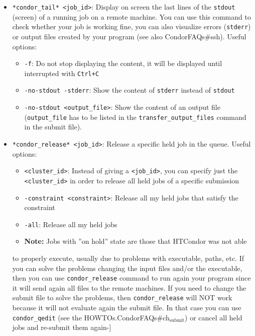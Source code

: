 \documentclass[a4paper,10pt]{article}
\begin{document}
\begin{itemize}
\item \texttt{*condor\_tail* <job\_id>}: Display on screen the last lines of the \texttt{stdout}
(screen) of a running job on a remote machine. You can use this command to
check whether your job is working fine, you can also visualize errors
(\texttt{stderr}) or output files created by your program (see also
CondorFAQs\#ssh). Useful options:
\begin{itemize}
\item \texttt{-f}: Do not stop displaying the content, it will be displayed until
interrupted with \texttt{Ctrl+C}
\item \texttt{-no-stdout -stderr}: Show the content of \texttt{stderr} instead of \texttt{stdout}
\item \texttt{-no-stdout <output\_file>}: Show the content of an output file (\texttt{output\_file}
has to be listed in the \texttt{transfer\_output\_files} command in the submit file).
\end{itemize}

\item \texttt{*condor\_release* <job\_id>}: Release a specific held job in the queue. Useful options:
\begin{itemize}
\item \texttt{<cluster\_id>}: Instead of giving a \texttt{<job\_id>}, you can specify just the
\texttt{<cluster\_id>} in order to release all held jobs of a specific submission
\item \texttt{-constraint <constraint>}: Release all my held jobs that satisfy the
constraint
\item \texttt{-all}: Release all my held jobs
\item \textbf{Note:} Jobs with ''on hold'' state are those that HTCondor was not able
\end{itemize}
to properly execute, usually due to problems with executable, paths, etc. If
you can solve the problems changing the input files and/or the executable,
then you can use \texttt{condor\_release} command to run again your program since it
will send again all files to the remote machines. If you need to change the
submit file to solve the problems, then \texttt{condor\_release} will NOT work because
it will not evaluate again the submit file. In that case you can use
\texttt{condor\_qedit} (see the HOWTOs.CondorFAQs\#ch\(_{\text{submit}}\)) or cancel all
held jobs and re-submit them again-]


\end{itemize}
\end{document}
